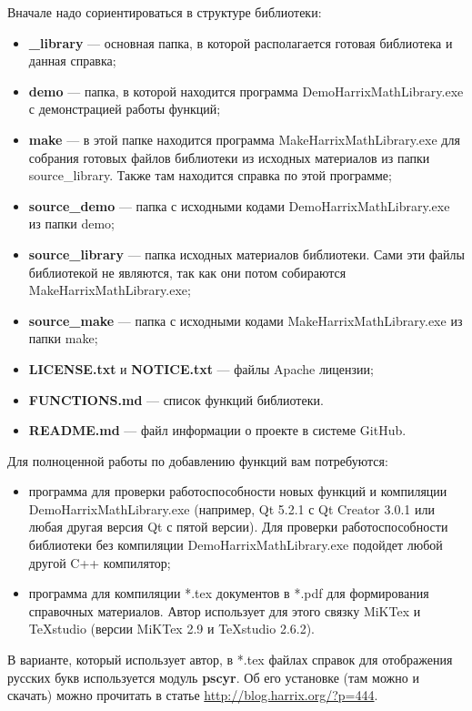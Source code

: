 \documentclass[a4paper,12pt]{article}
\begin{document}
Вначале надо сориентироваться в структуре библиотеки:
\begin{itemize}
\item \textbf{\_library} --- основная папка, в которой располагается готовая библиотека и данная справка;
\item \textbf{demo} --- папка, в которой находится программа DemoHarrixMathLibrary.exe с демонстрацией работы функций;
\item \textbf{make} --- в этой папке находится программа MakeHarrixMathLibrary.exe для собрания готовых файлов библиотеки из исходных материалов из папки source\_library. Также там находится справка по этой программе;
\item \textbf{source\_demo} --- папка с исходными кодами DemoHarrixMathLibrary.exe из папки demo;
\item \textbf{source\_library} --- папка исходных материалов библиотеки. Сами эти файлы библиотекой не являются, так как они потом собираются MakeHarrixMathLibrary.exe; 
\item \textbf{source\_make} --- папка с исходными кодами MakeHarrixMathLibrary.exe из папки make;
\item \textbf{LICENSE.txt} и \textbf{NOTICE.txt} --- файлы Apache лицензии;
\item \textbf{FUNCTIONS.md} --- список функций библиотеки.
\item \textbf{README.md} --- файл информации о проекте в системе GitHub.
\end{itemize}

Для полноценной работы по добавлению функций вам потребуются:
\begin{itemize}
\item программа для проверки работоспособности новых функций и компиляции DemoHarrixMathLibrary.exe (например, Qt 5.2.1 с Qt Creator 3.0.1 или любая другая версия Qt с пятой версии). Для проверки работоспособности библиотеки без компиляции DemoHarrixMathLibrary.exe подойдет любой другой C++ компилятор;
\item программа для компиляции *.tex документов в *.pdf для формирования справочных материалов. Автор использует для этого связку MiKTex и TeXstudio (версии MiKTex 2.9 и TeXstudio 2.6.2).
\end{itemize}

В варианте, который использует автор, в *.tex файлах справок для отображения русских букв используется модуль \textbf{pscyr}. Об его установке (там можно и скачать) можно прочитать в статье \href{http://blog.harrix.org/?p=444}{http://blog.harrix.org/?p=444}.
\end{document}
